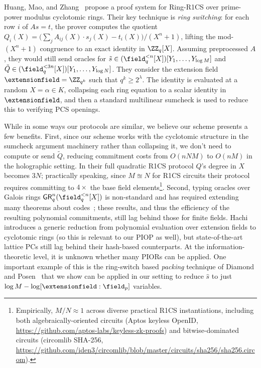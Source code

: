 Huang, Mao, and Zhang~\cite{EPRINT:HuaMaoZha25} propose a proof system for Ring-R1CS over prime-power modulus cyclotomic rings.
Their key technique is \emph{ring switching}: for each row $i$ of $As = t$, the prover computes the quotient $Q_i(X) = \bigl(\sum_j A_{ij}(X) \cdot s_j(X) - t_i(X)\bigr)/(X^n+1)$, lifting the mod-$(X^n+1)$ congruence to an exact identity in $\ZZ_q[X]$. Assuming preprocessed $A$, they would still send oracles for $\tilde{s} \in (\field_{q}^{<n}[X])[Y_1,\dotsc,Y_{\log M}]$ and $\tilde{Q}\in (\field_{q}^{<3n}[X])[Y_1,\dotsc,Y_{\log N}]$. They consider the extension field $\extensionfield = \ZZ_{q^k}$ such that $q^k \geq 2^\lambda$. The identity is evaluated at a random $X = \alpha \in K$, collapsing each ring equation to a scalar identity in $\extensionfield$, and then a standard multilinear sumcheck is used to reduce this to verifying PCS openings.

While in some ways our protocols are similar, we believe our scheme presents a few benefits. First, since our scheme works with the cyclotomic structure in the sumcheck argument machinery rather than collapsing it, we don't need to compute or send $\tilde{Q}$, reducing commitment costs from $O(nNM)$ to $O(nM)$ in the holographic setting. In their full quadratic R1CS protocol $Q$'s degree in $X$ becomes $3N$; practically speaking, since $M \approxeq N$ for R1CS circuits their protocol requires committing to $4\times$ the base field elements\footnote{Empirically, $M/N \approx 1$ across diverse practical R1CS instantiations, including both algebraically-oriented circuits (Aptos keyless OpenID, \url{https://github.com/aptos-labs/keyless-zk-proofs}) and bitwise-dominated circuits (circomlib SHA-256, \url{https://github.com/iden3/circomlib/blob/master/circuits/sha256/sha256.circom}).}. Second, typing oracles over Galois rings $\mathsf{GR}_{q}^{n}(\field_{q}^{<n}[X])$ is non-standard and has required extending many theorems about codes~\cite{ESORICS:WZDWZY25,C:JLXYY25}; these results, and thus the efficiency of the resulting polynomial commitments, still lag behind those for finite fields. Hachi~\cite{hachi} introduces a generic reduction from polynomial evaluation over extension fields to cyclotomic rings (so this is relevant to our PIOP as well), but state-of-the-art lattice PCs still lag behind their hash-based counterparts. At the information-theoretic level, it is unknown whether many PIORs can be applied. One important example of this is the ring-switch based \emph{packing} technique of Diamond and Posen~\cite{EC:DiaPos25} that we show can be applied in our setting to reduce $\hat{s}$ to just $\log M - \log [\extensionfield : \field_p]$ variables.

